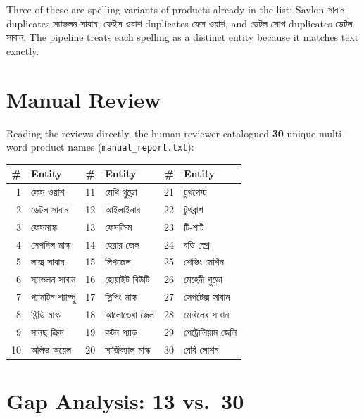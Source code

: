 \documentclass[11pt]{article}
\newcommand{\bn}[1]{{\bnfont #1}}
\begin{document}
Three of these are spelling variants of products already in the list:
\bn{Savlon সাবান} duplicates \bn{স্যাভলন সাবান}, \bn{ফেইস ওয়াশ} duplicates
\bn{ফেস ওয়াশ}, and \bn{ডেটল সোপ} duplicates \bn{ডেটল সাবান}. The pipeline treats
each spelling as a distinct entity because it matches text exactly.

\section{Manual Review}

Reading the reviews directly, the human reviewer catalogued \textbf{30} unique
multi-word product names (\texttt{manual\_report.txt}):

\begin{center}
\small
\begin{tabular}{@{}rl rl rl@{}}
\toprule
\# & Entity & \# & Entity & \# & Entity \\
\midrule
1  & \bn{ফেস ওয়াশ}       & 11 & \bn{মেথি গুড়ো}     & 21 & \bn{টুথপেস্ট} \\
2  & \bn{ডেটল সাবান}      & 12 & \bn{আইলাইনার}       & 22 & \bn{টুথব্রাশ} \\
3  & \bn{ফেসমাস্ক}        & 13 & \bn{ফেসক্রিম}       & 23 & \bn{টি-শার্ট} \\
4  & \bn{সেপনিল মাস্ক}    & 14 & \bn{হেয়ার জেল}     & 24 & \bn{বডি স্প্রে} \\
5  & \bn{লাক্স সাবান}     & 15 & \bn{লিপজেল}         & 25 & \bn{শেভিং মেশিন} \\
6  & \bn{স্যাভলন সাবান}   & 16 & \bn{হোয়াইট বিউটি}  & 26 & \bn{মেহেদী গুড়ো} \\
7  & \bn{প্যানটিন শ্যাম্পু} & 17 & \bn{স্লিপিং মাস্ক} & 27 & \bn{সেপটেক্স সাবান} \\
8  & \bn{থ্রিডি মাস্ক}    & 18 & \bn{আলোভেরা জেল}    & 28 & \bn{মেরিলের সাবান} \\
9  & \bn{সানছ ক্রিম}      & 19 & \bn{কটন প্যাড}      & 29 & \bn{পেট্রোলিয়াম জেলি} \\
10 & \bn{অলিভ অয়েল}      & 20 & \bn{সার্জিক্যাল মাস্ক} & 30 & \bn{বেবি লোশন} \\
\bottomrule
\end{tabular}
\end{center}

\section{Gap Analysis: 13 vs.\ 30}
\label{sec:gap}
\end{document}
